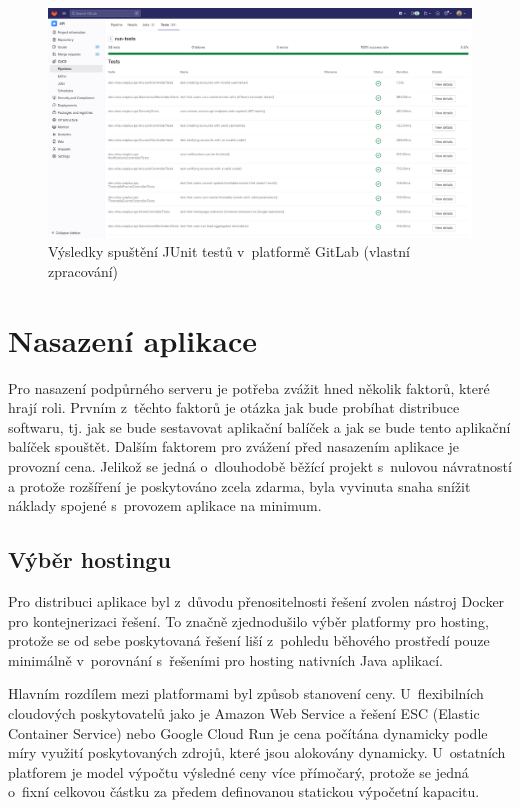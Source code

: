 \begin{figure}[htbp!]\centering
    \includegraphics[width=\textwidth]{img/gitlab-ci-junit.png}
    \caption{Výsledky spuštění JUnit testů v~platformě GitLab (vlastní zpracování)}
    \label{fig:gitlab-ci-junit}
\end{figure}
 
\section{Nasazení aplikace}

Pro nasazení podpůrného serveru je potřeba zvážit hned několik faktorů, které hrají roli. 
Prvním z~těchto faktorů je otázka jak bude probíhat distribuce softwaru, tj. jak se bude sestavovat aplikační balíček a jak se bude tento aplikační balíček spouštět. 
Dalším faktorem pro zvážení před nasazením aplikace je provozní cena. Jelikož se jedná o~dlouhodobě běžící projekt s~nulovou návratností a protože rozšíření je poskytováno zcela zdarma, byla vyvinuta snaha snížit náklady spojené s~provozem aplikace na minimum.

\subsection{Výběr hostingu}

Pro distribuci aplikace byl z~důvodu přenositelnosti řešení zvolen nástroj Docker pro kontejnerizaci řešení. To značně zjednodušilo výběr platformy pro hosting, protože se od sebe poskytovaná řešení liší z~pohledu běhového prostředí pouze minimálně v~porovnání s~řešeními pro hosting nativních Java aplikací.

Hlavním rozdílem mezi platformami byl způsob stanovení ceny. U~flexibilních cloudových poskytovatelů jako je Amazon Web Service a řešení ESC (Elastic Container Service) nebo Google Cloud Run je cena počítána dynamicky podle míry využití poskytovaných zdrojů, které jsou alokovány dynamicky. U~ostatních platforem je model výpočtu výsledné ceny více přímočarý, protože se jedná o~fixní celkovou částku za předem definovanou statickou výpočetní kapacitu.

